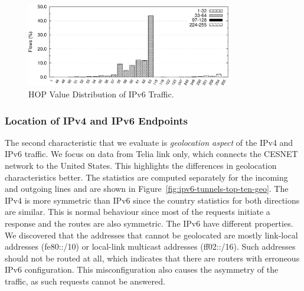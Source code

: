\begin{figure}[tb]
        \centering
        \includegraphics[width=0.8\textwidth]{figures/paper-tunnels/ttl/native-hop}
        \caption{HOP Value Distribution of IPv6 Traffic.}
        \label{fig:ipv6-tunnels-ipv6-native-hop}
\end{figure}


\subsubsection{Location of IPv4 and IPv6 Endpoints}
The second characteristic that we evaluate is \textit{geolocation aspect} of the IPv4 and IPv6 traffic. We focus on data from Telia link only, which connects the CESNET network to the United States. This highlights the differences in geolocation characteristics better. The statistics are computed separately for the incoming and outgoing lines and are shown in Figure~\ref{fig:ipv6-tunnels-top-ten-geo}. The IPv4 is more symmetric than IPv6 since the country statistics for both directions are similar. This is normal behaviour since most of the requests initiate a response and the routes are also symmetric. The IPv6 have different properties. We discovered that the addresses that cannot be geolocated are mostly link-local addresses (fe80::/10) or local-link multicast addresses (ff02::/16). Such addresses should not be routed at all, which indicates that there are routers with erroneous IPv6 configuration. This misconfiguration also causes the asymmetry of the traffic, as such requests cannot be answered.


